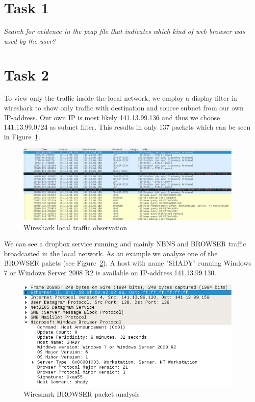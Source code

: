 \documentclass[12pt]{article}
\begin{document}
\maketitle


\section{Task 1}\label{task1}
\emph{Search for evidence in the pcap file that indicates which kind of web browser was
used by the user?}


\section{Task 2}\label{task2}
To view only the traffic inside the local network, we employ a display filter in wireshark to show only traffic with destination and source subnet from our own IP-address. Our own IP is most likely 141.13.99.136 and thus we choose 141.13.99.0/24 as subnet filter. This results in only 137 packets which can be seen in Figure~\ref{img_wireshark_overview}.

\begin{figure}[h]%
\centering%
\includegraphics[width=\textwidth]{images/wireshark_overview.png}%
\caption{Wireshark local traffic observation}%
\label{img_wireshark_overview}%
\end{figure}%


We can see a dropbox service running and mainly NBNS and BROWSER traffic broadcasted in the local network. As an example we analyze one of the BROWSER pakets (see Figure~\ref{img_wireshark_browser}).
A host with name "SHADY" running Windows 7 or Windows Server 2008 R2 is available on IP-address 141.13.99.130.

\begin{figure}[h]%
\centering%
\includegraphics[width=\textwidth]{images/wireshark_browser.png}%
\caption{Wireshark BROWSER packet analysis}%
\label{img_wireshark_browser}%
\end{figure}%
\end{document}
